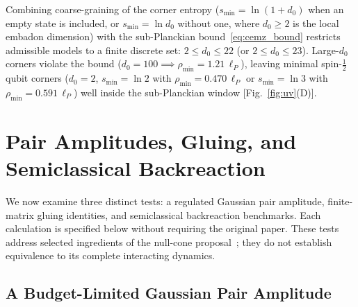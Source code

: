 \documentclass[onecolumn,11pt,aps,prd,amsmath,amssymb,nofootinbib,floatfix]{revtex4-2}
\newcommand{\lP}{\ell_P}
\begin{document}
Combining coarse-graining of the corner entropy ($s_{\min}=\ln(1+d_0)$ when an empty state is included, or $s_{\min}=\ln d_0$ without one, where $d_0\ge 2$ is the local embadon dimension) with the sub-Planckian bound~\eqref{eq:cemz_bound} restricts admissible models to a finite discrete set: $2\le d_0\le 22$ (or $2\le d_0\le 23$). Large-$d_0$ corners violate the bound ($d_0=100\implies \rho_{\min}=1.21\,\lP$), leaving minimal spin-$\frac{1}{2}$ qubit corners ($d_0=2$, $s_{\min}=\ln 2$ with $\rho_{\min}=0.470\,\lP$ or $s_{\min}=\ln 3$ with $\rho_{\min}=0.591\,\lP$) well inside the sub-Planckian window [Fig.~\ref{fig:uv}(D)].

\section{Pair Amplitudes, Gluing, and Semiclassical Backreaction}\label{sec:orig_sections}

We now examine three distinct tests: a regulated Gaussian pair amplitude, finite-matrix gluing identities, and semiclassical backreaction benchmarks. Each calculation is specified below without requiring the original paper. These tests address selected ingredients of the null-cone proposal~\cite{Chandrasekaran2026}; they do not establish equivalence to its complete interacting dynamics.



\subsection{A Budget-Limited Gaussian Pair Amplitude}\label{sec:orig_44}
\end{document}
